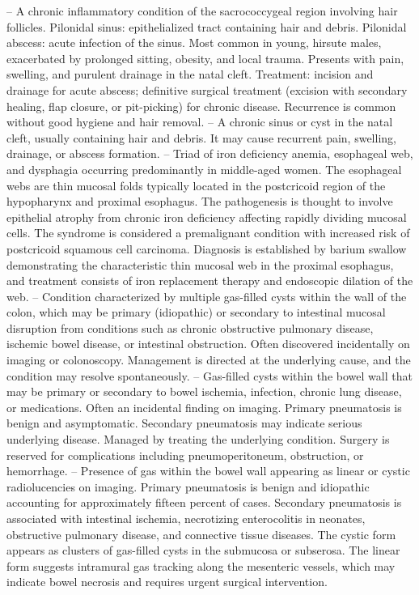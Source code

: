 -- A chronic inflammatory condition of the sacrococcygeal region involving hair follicles. Pilonidal sinus: epithelialized tract containing hair and debris. Pilonidal abscess: acute infection of the sinus. Most common in young, hirsute males, exacerbated by prolonged sitting, obesity, and local trauma. Presents with pain, swelling, and purulent drainage in the natal cleft. Treatment: incision and drainage for acute abscess; definitive surgical treatment (excision with secondary healing, flap closure, or pit-picking) for chronic disease. Recurrence is common without good hygiene and hair removal.
-- A chronic sinus or cyst in the natal cleft, usually containing hair and debris. It may cause recurrent pain, swelling, drainage, or abscess formation.
-- Triad of iron deficiency anemia, esophageal web, and dysphagia occurring predominantly in middle-aged women. The esophageal webs are thin mucosal folds typically located in the postcricoid region of the hypopharynx and proximal esophagus. The pathogenesis is thought to involve epithelial atrophy from chronic iron deficiency affecting rapidly dividing mucosal cells. The syndrome is considered a premalignant condition with increased risk of postcricoid squamous cell carcinoma. Diagnosis is established by barium swallow demonstrating the characteristic thin mucosal web in the proximal esophagus, and treatment consists of iron replacement therapy and endoscopic dilation of the web.
-- Condition characterized by multiple gas-filled cysts within the wall of the colon, which may be primary (idiopathic) or secondary to intestinal mucosal disruption from conditions such as chronic obstructive pulmonary disease, ischemic bowel disease, or intestinal obstruction. Often discovered incidentally on imaging or colonoscopy. Management is directed at the underlying cause, and the condition may resolve spontaneously.
-- Gas-filled cysts within the bowel wall that may be primary or secondary to bowel ischemia, infection, chronic lung disease, or medications. Often an incidental finding on imaging. Primary pneumatosis is benign and asymptomatic. Secondary pneumatosis may indicate serious underlying disease. Managed by treating the underlying condition. Surgery is reserved for complications including pneumoperitoneum, obstruction, or hemorrhage.
-- Presence of gas within the bowel wall appearing as linear or cystic radiolucencies on imaging. Primary pneumatosis is benign and idiopathic accounting for approximately fifteen percent of cases. Secondary pneumatosis is associated with intestinal ischemia, necrotizing enterocolitis in neonates, obstructive pulmonary disease, and connective tissue diseases. The cystic form appears as clusters of gas-filled cysts in the submucosa or subserosa. The linear form suggests intramural gas tracking along the mesenteric vessels, which may indicate bowel necrosis and requires urgent surgical intervention.
